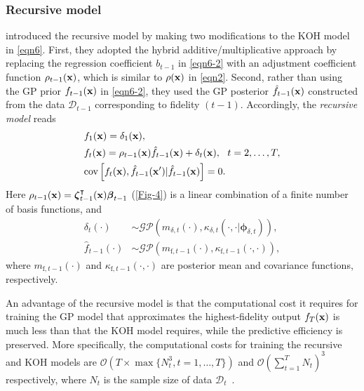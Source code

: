\documentclass[journal ]{new-aiaa}
\begin{document}
\subsubsection{Recursive model}\label{Sec423}

\citet{Gratiet2014} introduced the recursive model by making two modifications to the KOH model in \cref{eqn6}.
First, they adopted the hybrid additive/multiplicative approach by replacing the regression coefficient $b_{t-1}$ in \cref{eqn6-2} with an adjustment coefficient function $\rho_{t-1}({\bf x})$, which is similar to $\rho({\bf x})$ in \cref{eqn2}.
Second, rather than using the GP prior $f_{t-1}({\bf x})$ in \cref{eqn6-2}, they used the GP posterior $\hat{f}_{t-1}({\bf x})$ constructed from the data $\mathcal{D}_{t-1}$ corresponding to fidelity $(t-1)$.
Accordingly, the \textit{recursive model} reads
\begin{subequations}\label{eqn14}
	\begin{align}
		& f_1({\bf x}) = \delta_1({\bf x}), \label{eqn14-1}\\
		& f_t({\bf x}) =
		\rho_{t-1}({\bf x}) \hat{f}_{t-1}({\bf x}) + \delta_{t}({\bf x}), \ \ t=2,\dots,T \label{eqn14-2},\\
		&\text{cov}\left[f_{t}({\bf x}),\hat{f}_{t-1}({\bf x}')|\hat{f}_{t-1}({\bf x})\right]=0 
		\label{eqn14-3}.
	\end{align}
\end{subequations}
Here $\rho_{t-1}({\bf x}) = {\boldsymbol \zeta}_{t-1}^\intercal({\bf x}) {\boldsymbol \beta}_{t-1}$ (\cref{Fig-4}) is a linear combination of a finite number of basis functions, and
\begin{subequations}\label{eqn15}
	\begin{align}
		\delta_{t}(\cdot) & \sim \mathcal{GP}\left(m_{\delta,t}(\cdot),\kappa_{\delta,t}(\cdot,\cdot|{\boldsymbol \phi}_{\delta,t})\right)
		\label{eqn15-1},\\
		\hat{f}_{t-1}(\cdot) & \sim \mathcal{GP}\left(m_{\text{f},t-1}(\cdot),\kappa_{\text{f},t-1}(\cdot,\cdot)\right) 
		\label{eqn15-2},
	\end{align}
\end{subequations}
where $m_{\text{f},t-1}(\cdot)$ and $\kappa_{\text{f},t-1}(\cdot,\cdot)$ are posterior mean and covariance functions, respectively.

An advantage of the recursive model is that the computational cost it requires for training the GP model that approximates the highest-fidelity output $f_T({\bf x})$ is much less than that the KOH model requires, while the predictive efficiency is preserved.
More specifically, the computational costs for training the recursive and KOH models are $\mathcal{O}\left(T \times \max\{N_t^3,t=1,\dots,T\}\right)$ and $\mathcal{O}(\sum_{t=1}^T N_t)^3$ respectively, where $N_t$ is the sample size of data $\mathcal{D}_t$~\citep{Gratiet2014}. 
\end{document}
